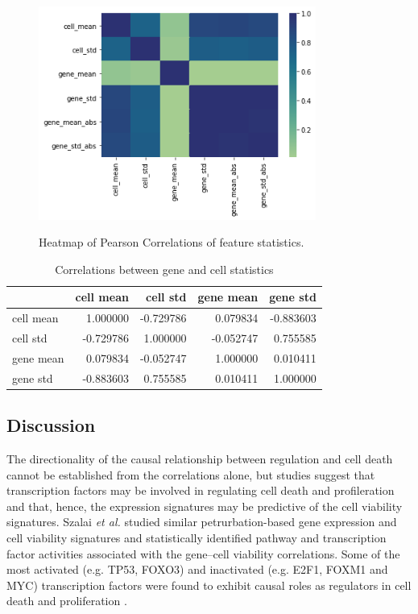 \documentclass[bsc,frontabs,twoside,singlespacing,parskip,deptreport]{infthesis}     %
\let\Oldsubsection\subsection
\renewcommand{\subsection}{\FloatBarrier\Oldsubsection}
\begin{document}
\begin{figure}[h!]
\centering
\caption{Heatmap of Pearson Correlations of feature statistics.}
\includegraphics[height=7cm]{images/gene_cell_corr.png}\label{corr_map}
\end{figure}
\begin{table}[h!]
\centering
\begin{tabular}{lrrrr}
\toprule
{} &  cell mean &  cell std &  gene mean &  gene std \\
\midrule
cell mean &   1.000000 & -0.729786 &   0.079834 & -0.883603 \\
cell std  &  -0.729786 &  1.000000 &  -0.052747 &  0.755585 \\
gene mean &   0.079834 & -0.052747 &   1.000000 &  0.010411 \\
gene std  &  -0.883603 &  0.755585 &   0.010411 &  1.000000 \\
\bottomrule
\end{tabular}
\caption{Correlations between gene and cell statistics}\label{cell_gene_corr_table}
\end{table}

\subsection{Discussion}
The directionality of the causal relationship between regulation and cell death cannot be established from the correlations alone, but studies suggest that transcription factors may be involved in regulating cell death and profileration and that, hence, the expression signatures may be predictive of the cell viability signatures. Szalai \textit{et al.} studied similar petrurbation-based gene expression and cell viability signatures and statistically identified pathway and transcription factor activities associated with the gene–cell viability correlations. Some of the most activated (e.g. TP53, FOXO3) and inactivated (e.g. E2F1, FOXM1 and MYC) transcription factors were found to exhibit causal roles as regulators in cell death and proliferation \cite{szalai_signatures_2019}.
\end{document}
